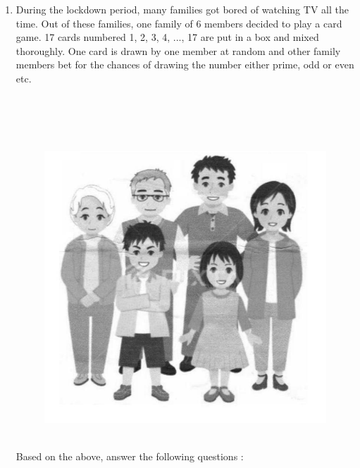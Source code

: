 \documentclass{exam}
\begin{document}
	\begin{enumerate}

		\item During the lockdown period, many families got bored of watching TV all the time. Out of these families, one family of 6 members decided to play a card game. 17 cards numbered 1, 2, 3, 4, ..., 17 are put in a box and mixed thoroughly. One card is drawn by one member at random and other family members bet for the chances of drawing the number either prime, odd or even etc. 
		\\
		\\
		\\
		\\
		\\
        \begin{figure}[h!]
          \centering
          \includegraphics[scale=0.8]{1.jpg}
        \end{figure} 
        \\
		Based on the above, answer the following questions : 
		

\end{enumerate}
\end{document}
